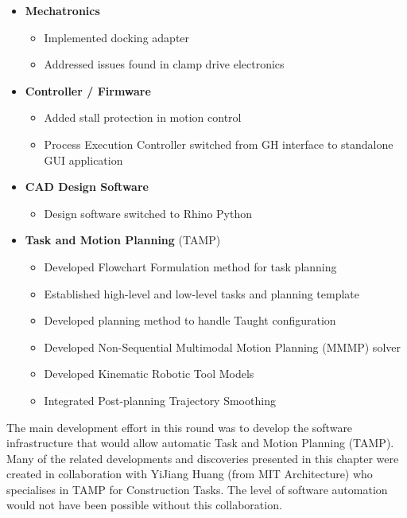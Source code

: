 \begin{itemize}
	\item \textbf{Mechatronics}
    \begin{itemize}[nosep]
	   \item Implemented docking adapter
	   \item Addressed issues found in clamp drive electronics
    \end{itemize}
    
	\item \textbf{Controller / Firmware}
    \begin{itemize}[nosep]
    	\item Added stall protection in motion control
    	\item Process Execution Controller switched from GH interface to standalone GUI application
    \end{itemize}
    
	\item \textbf{CAD Design Software}
    \begin{itemize}[nosep]
    	\item Design software switched to Rhino Python
    \end{itemize}
    
    \item \textbf{Task and Motion Planning }(TAMP)
    \begin{itemize}[nosep]
    	\item Developed Flowchart Formulation method for task planning
    	\item Established high-level and low-level tasks and planning template
    	\item Developed planning method to handle Taught configuration
    	\item Developed Non-Sequential Multimodal Motion Planning (MMMP) solver
    	\item Developed Kinematic Robotic Tool Models
    	\item Integrated Post-planning Trajectory Smoothing
    \end{itemize}
    
\end{itemize}

The main development effort in this round was to develop the software infrastructure that would allow automatic Task and Motion Planning (TAMP). Many of the related developments and discoveries presented in this chapter were created in collaboration with YiJiang Huang (from MIT Architecture) who specialises in TAMP for Construction Tasks. The level of software automation would not have been possible without this collaboration.

